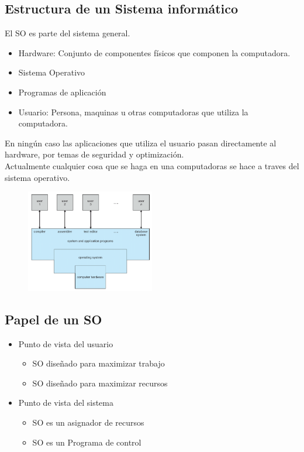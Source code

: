\documentclass{templateNote}
\begin{document}
\subsection*{Estructura de un Sistema informático}
\noindent El SO es parte del sistema general.
\begin{itemize}
    \item Hardware: Conjunto de componentes físicos que componen la computadora.
    \item Sistema Operativo
    \item Programas de aplicación
    \item Usuario: Persona, maquinas u otras computadoras que utiliza la computadora.
\end{itemize}

\noindent En ningún caso las aplicaciones que utiliza el usuario pasan directamente al hardware, por temas de seguridad y optimización. \\
Actualmente cualquier cosa que se haga en una computadoras se hace a traves del sistema operativo.


\begin{figure}[H]
    \centering
    \includegraphics[width=0.5\textwidth]{img/estructura.png}
\end{figure}


\subsection*{Papel de un SO}
\begin{itemize}
    \item Punto de vista del usuario
    \begin{itemize}
        \item SO diseñado para maximizar trabajo
        \item SO diseñado para maximizar recursos
    \end{itemize}
    \item Punto de vista del sistema
    \begin{itemize}
        \item SO es un asignador de recursos
        \item SO es un Programa de control
    \end{itemize}
\end{itemize}
\end{document}
